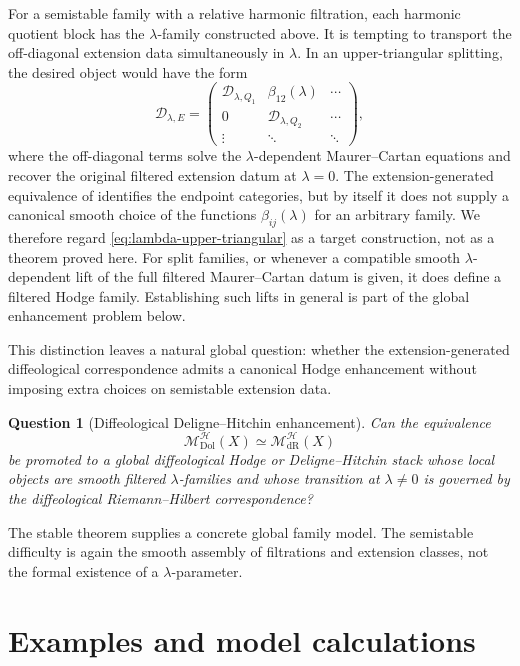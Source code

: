 \documentclass[11pt,reqno]{amsart}
\newtheorem{question}[theorem]{Question}
\theoremstyle{definition}
\theoremstyle{remark}
\newcommand{\cD}{\mathcal D}
\newcommand{\cH}{\mathcal H}
\newcommand{\Dol}{\mathrm{Dol}}
\newcommand{\dR}{\mathrm{dR}}
\newcommand{\MHDol}{\mathscr M^{\cH}_{\Dol}}
\newcommand{\MHdR}{\mathscr M^{\cH}_{\dR}}
\begin{document}
For a semistable family with a relative harmonic filtration, each harmonic quotient block has the $\lambda$-family constructed above.  It is tempting to transport the off-diagonal extension data simultaneously in $\lambda$.  In an upper-triangular splitting, the desired object would have the form
\begin{equation}\label{eq:lambda-upper-triangular}
  \cD_{\lambda,E}
  =
  \begin{pmatrix}
    \cD_{\lambda,Q_1} & \beta_{12}(\lambda) & \cdots\\
    0 & \cD_{\lambda,Q_2} & \cdots\\
    \vdots & \ddots & \ddots
  \end{pmatrix},
\end{equation}
where the off-diagonal terms solve the $\lambda$-dependent
Maurer--Cartan equations and recover the original filtered extension
datum at $\lambda=0$.  The extension-generated equivalence of
\cite{AzamRayan2026} identifies the endpoint categories, but by itself
it does not supply a canonical smooth choice of the functions
$\beta_{ij}(\lambda)$ for an arbitrary family.  We therefore regard
\eqref{eq:lambda-upper-triangular} as a target construction, not as a
theorem proved here.  For split families, or whenever a compatible
smooth $\lambda$-dependent lift of the full filtered Maurer--Cartan
datum is given, it does define a filtered Hodge family.  Establishing
such lifts in general is part of the global enhancement problem below.


This distinction leaves a natural global question: whether the extension-generated diffeological correspondence admits a canonical Hodge enhancement without imposing extra choices on semistable extension data.


\begin{question}[Diffeological Deligne--Hitchin enhancement]\label{q:global-Hodge}
Can the equivalence
\[
  \MHDol(X)\simeq\MHdR(X)
\]
be promoted to a global diffeological Hodge or Deligne--Hitchin stack whose local objects are smooth filtered $\lambda$-families and whose transition at $\lambda\ne0$ is governed by the diffeological Riemann--Hilbert correspondence?
\end{question}

The stable theorem supplies a concrete global family model.  The semistable difficulty is again the smooth assembly of filtrations and extension classes, not the formal existence of a $\lambda$-parameter.

\section{Examples and model calculations}\label{sec:examples}
\end{document}
